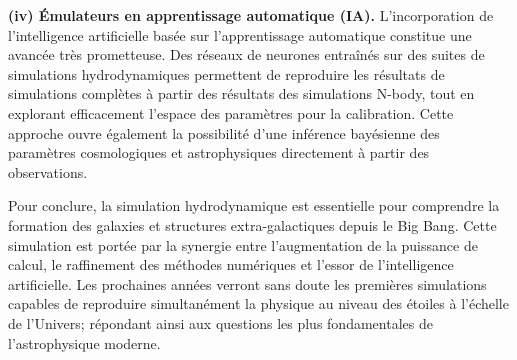 \documentclass{article}
\begin{document}
\textbf{(iv) Émulateurs en apprentissage automatique (IA).} 
L'incorporation de l'intelligence artificielle basée sur l'apprentissage automatique constitue une avancée très prometteuse. Des 
réseaux de neurones entraînés sur des suites de simulations hydrodynamiques \cite{Villaescusa2021} permettent de reproduire les résultats de simulations complètes à partir des résultats des simulations N-body, tout en explorant efficacement l'espace des paramètres pour la calibration. Cette approche ouvre également la possibilité d'une inférence bayésienne des paramètres cosmologiques et astrophysiques directement à partir des observations.

Pour conclure, la simulation hydrodynamique est essentielle pour comprendre la formation des galaxies et structures extra-galactiques depuis le Big Bang. Cette simulation est portée par la synergie entre l'augmentation de la puissance de calcul, le raffinement des méthodes numériques et l'essor de l'intelligence artificielle. Les prochaines années verront sans doute les premières simulations capables de reproduire simultanément la physique au niveau des étoiles à l'échelle de l'Univers; répondant ainsi aux questions les plus fondamentales de l'astrophysique moderne.


\end{document}
